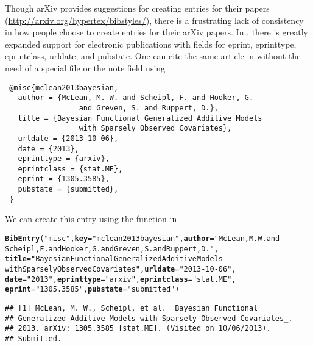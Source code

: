 \documentclass[article]{jss}\usepackage[]{graphicx}\usepackage[]{color}
\makeatletter
\newcommand{\hlstr}[1]{\textcolor[rgb]{0.125,0.125,1}{#1}}%
\newcommand{\hlstd}[1]{\textcolor[rgb]{0.251,0.251,0.282}{#1}}%
\newcommand{\hlkwc}[1]{\textcolor[rgb]{0.529,0,0.184}{\textbf{#1}}}%
\newcommand{\hlkwd}[1]{\textcolor[rgb]{0.251,0.251,0.282}{\textbf{#1}}}%
\newenvironment{kframe}{%
 \def\at@end@of@kframe{}%
 \ifinner\ifhmode%
  \def\at@end@of@kframe{\end{minipage}}%
  \begin{minipage}{\columnwidth}%
 \fi\fi%
 \def\FrameCommand##1{\hskip\@totalleftmargin \hskip-\fboxsep
 \colorbox{shadecolor}{##1}\hskip-\fboxsep
     \hskip-\linewidth \hskip-\@totalleftmargin \hskip\columnwidth}%
 \MakeFramed {\advance\hsize-\width
   \@totalleftmargin\z@ \linewidth\hsize
   \@setminipage}}%
 {\par\unskip\endMakeFramed%
 \at@end@of@kframe}
\newenvironment{knitrout}{}{} %
\newcommand{\ourpkg}{\pkg{RefManageR}}
\makeatother
\begin{document}
Though arXiv provides suggestions for creating \Bibtex{} entries for their papers (\url{http://arxiv.org/hypertex/bibstyles/}), there is a frustrating lack of consistency in how people choose to create \Bibtex{} entries for their arXiv papers.  In \Biblatex{}, there is greatly expanded support for electronic publications with fields for eprint, eprinttype, eprintclass, urldate, and pubstate.  One can cite the same article in \Biblatex{} without the need of a special  file or the note field using
 \begin{verbatim}
 @misc{mclean2013bayesian,
   author = {McLean, M. W. and Scheipl, F. and Hooker, G.
                 and Greven, S. and Ruppert, D.},
   title = {Bayesian Functional Generalized Additive Models 
                 with Sparsely Observed Covariates},
   urldate = {2013-10-06},
   date = {2013},
   eprinttype = {arxiv},
   eprintclass = {stat.ME},
   eprint = {1305.3585},
   pubstate = {submitted},
 }
 \end{verbatim}
 We can create this entry using the  function in \ourpkg{}
\begin{knitrout}
\color{fgcolor}\begin{kframe}
\begin{alltt}
\hlkwd{BibEntry}\hlstd{(}\hlstr{"misc"}\hlstd{,} \hlkwc{key} \hlstd{=} \hlstr{"mclean2013bayesian"}\hlstd{,} \hlkwc{author} \hlstd{=} \hlstr{"McLean, M. W. and 
         Scheipl, F. and Hooker, G. and Greven, S. and Ruppert, D."}\hlstd{,}
         \hlkwc{title} \hlstd{=} \hlstr{"Bayesian Functional Generalized Additive Models 
                 with Sparsely Observed Covariates"}\hlstd{,} \hlkwc{urldate} \hlstd{=} \hlstr{"2013-10-06"}\hlstd{,}
         \hlkwc{date} \hlstd{=} \hlstr{"2013"}\hlstd{,} \hlkwc{eprinttype} \hlstd{=} \hlstr{"arxiv"}\hlstd{,} \hlkwc{eprintclass} \hlstd{=} \hlstr{"stat.ME"}\hlstd{,}
         \hlkwc{eprint} \hlstd{=} \hlstr{"1305.3585"}\hlstd{,} \hlkwc{pubstate} \hlstd{=} \hlstr{"submitted"}\hlstd{)}
\end{alltt}
\begin{verbatim}
## [1] McLean, M. W., Scheipl, et al. _Bayesian Functional
## Generalized Additive Models with Sparsely Observed Covariates_.
## 2013. arXiv: 1305.3585 [stat.ME]. (Visited on 10/06/2013).
## Submitted.
\end{verbatim}
\end{kframe}
\end{knitrout}
\end{document}

